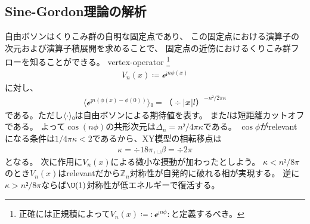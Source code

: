 \documentclass[12pt]{ltjsarticle}
\begin{document}

\subsection*{Sine-Gordon理論の解析}
自由ボソンはくりこみ群の自明な固定点であり、
この固定点における演算子の次元および演算子積展開を求めることで、
固定点の近傍におけるくりこみ群フローを知ることができる。
vertex-operator \footnote{
    正確には正規積によって$V_n(x) ≔ {:ℯ^{¡nϕ}:}$と定義するべき。
}
\begin{align}
    V_n(x) ≔ ℯ^{¡nϕ(x)}
\end{align}
に対し、
\begin{align}
    ⟨ℯ^{¡n(ϕ(x)-ϕ(0))}⟩₀
    = （÷{|𝒙|}{l}）^{-n²/2πκ}
\end{align}
である。ただし$⟨⋅⟩₀$は自由ボソンによる期待値を表す。
また$l$は短距離カットオフである。
よって$\cos(nϕ)$の共形次元は$Δ_n = n²/4πκ$である。
$\cos ϕ $がrelevantになる条件は$1/4πκ < 2$であるから、XY模型の相転移点は
\begin{align}
    κ = ÷{1}{8π},␣ β = ÷{2}{π}
\end{align}
となる。
次に作用に$V_n(x)$による微小な摂動が加わったとしよう。
$κ < n²/8π$のとき$V_n(x)$はrelevantだから$ℤ_n$対称性が自発的に破れる相が実現する。
逆に$κ > n²/8π$ならば$\U(1)$対称性が低エネルギーで復活する。
\end{document}

